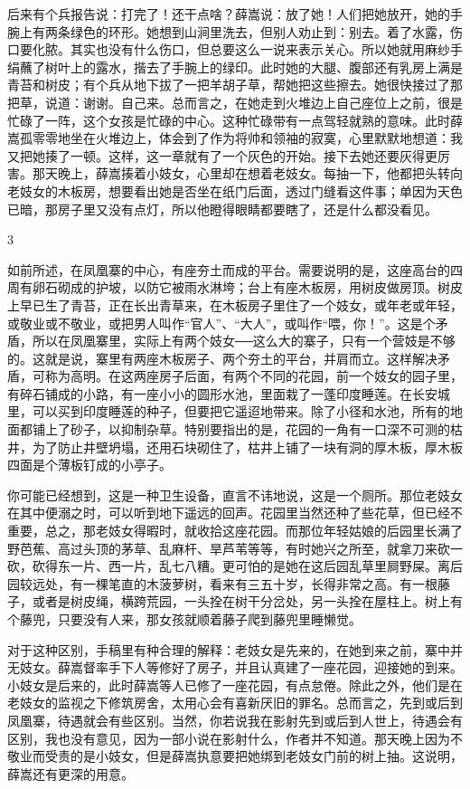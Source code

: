 后来有个兵报告说：打完了！还干点啥？薛嵩说：放了她！人们把她放开，她的手腕上有两条绿色的环形。她想到山涧里洗去，但别人劝止到：别去。着了水露，伤口要化脓。其实也没有什么伤口，但总要这么一说来表示关心。所以她就用麻纱手绢蘸了树叶上的露水，揩去了手腕上的绿印。此时她的大腿、腹部还有乳房上满是青苔和树皮；有个兵从地下拔了一把羊胡子草，帮她把这些擦去。她很快接过了那把草，说道：谢谢。自己来。总而言之，在她走到火堆边上自己座位上之前，很是忙碌了一阵，这个女孩是忙碌的中心。这种忙碌带有一点驾轻就熟的意味。此时薛嵩孤零零地坐在火堆边上，体会到了作为将帅和领袖的寂寞，心里默默地想道：我又把她揍了一顿。这样，这一章就有了一个灰色的开始。接下去她还要灰得更厉害。那天晚上，薛嵩揍着小妓女，心里却在想着老妓女。每抽一下，他都把头转向老妓女的木板房，想要看出她是否坐在纸门后面，透过门缝看这件事；单因为天色已暗，那房子里又没有点灯，所以他瞪得眼睛都要瞎了，还是什么都没看见。 

3 

如前所述，在凤凰寨的中心，有座夯土而成的平台。需要说明的是，这座高台的四周有卵石砌成的护坡，以防它被雨水淋垮；台上有座木板房，用树皮做房顶。树皮上早已生了青苔，正在长出青草来，在木板房子里住了一个妓女，或年老或年轻，或敬业或不敬业，或把男人叫作“官人”、“大人”，或叫作“喂，你！”。这是个矛盾，所以在凤凰寨里，实际上有两个妓女──这么大的寨子，只有一个营妓是不够的。这就是说，寨里有两座木板房子、两个夯土的平台，并肩而立。这样解决矛盾，可称为高明。在这两座房子后面，有两个不同的花园，前一个妓女的园子里，有碎石铺成的小路，有一座小小的圆形水池，里面栽了一蓬印度睡莲。在长安城里，可以买到印度睡莲的种子，但要把它遥迢地带来。除了小径和水池，所有的地面都铺上了砂子，以抑制杂草。特别要指出的是，花园的一角有一口深不可测的枯井，为了防止井壁坍塌，还用石块砌住了，枯井上铺了一块有洞的厚木板，厚木板四面是个薄板钉成的小亭子。 

你可能已经想到，这是一种卫生设备，直言不讳地说，这是一个厕所。那位老妓女在其中便溺之时，可以听到地下遥远的回声。花园里当然还种了些花草，但已经不重要，总之，那老妓女得暇时，就收拾这座花园。而那位年轻姑娘的后园里长满了野芭蕉、高过头顶的茅草、乱麻杆、旱芦苇等等，有时她兴之所至，就拿刀来砍一砍，砍得东一片、西一片，乱七八糟。更可怕的是她在这后园乱草里屙野屎。离后园较远处，有一棵笔直的木菠萝树，看来有三五十岁，长得非常之高。有一根藤子，或者是树皮绳，横跨荒园，一头拴在树干分岔处，另一头拴在屋柱上。树上有个藤兜，只要没有人来，那女孩就顺着藤子爬到藤兜里睡懒觉。 

对于这种区别，手稿里有种合理的解释：老妓女是先来的，在她到来之前，寨中并无妓女。薛嵩督率手下人等修好了房子，并且认真建了一座花园，迎接她的到来。小妓女是后来的，此时薛嵩等人已修了一座花园，有点怠倦。除此之外，他们是在老妓女的监视之下修筑房舍，太用心会有喜新厌旧的罪名。总而言之，先到或后到凤凰寨，待遇就会有些区别。当然，你若说我在影射先到或后到人世上，待遇会有区别，我也没有意见，因为一部小说在影射什么，作者并不知道。那天晚上因为不敬业而受责的是小妓女，但是薛嵩执意要把她绑到老妓女门前的树上抽。这说明，薛嵩还有更深的用意。 

